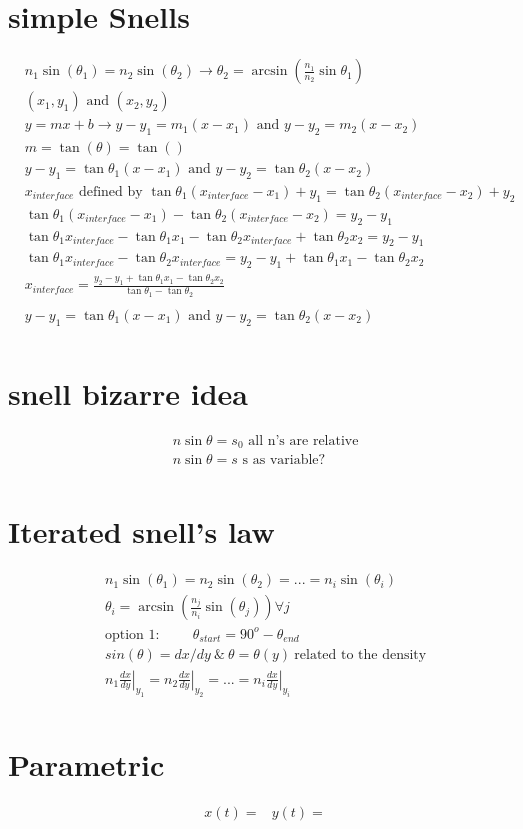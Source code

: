 \documentclass{article}
\begin{document}
	\section{simple Snells}
		\begin{align}
			&n_1\sin(\theta_1) = n_2\sin(\theta_2) \rightarrow \theta_2 = \arcsin(\frac{n_1}{n_2}\sin\theta_1)\\
			&(x_1,y_1) \text{ and } (x_2, y_2)\\
			&y=mx+b \rightarrow y-y_1 = m_1(x-x_1) \text{  and  } y-y_2 = m_2(x-x_2)\\
			& m = \tan(\theta)=\tan()\\
			&y-y_1 = \tan\theta_1(x-x_1) \text{  and  } y-y_2 = \tan\theta_2(x-x_2)\\
			&x_{interface} \text{ defined by } \tan\theta_1(x_{interface}-x_1) + y_1 = \tan\theta_2(x_{interface}-x_2) + y_2\\
			& \tan\theta_1(x_{interface}-x_1) - \tan\theta_2(x_{interface}-x_2) = y_2-y_1\\
			& \tan\theta_1x_{interface}-\tan\theta_1x_1 - \tan\theta_2x_{interface}+\tan\theta_2x_2 = y_2-y_1\\
			& \tan\theta_1x_{interface} - \tan\theta_2x_{interface} = y_2-y_1 + \tan\theta_1x_1 - \tan\theta_2x_2\\
			& x_{interface} = \frac{y_2-y_1 + \tan\theta_1x_1 - \tan\theta_2x_2}{\tan\theta_1 - \tan\theta_2}\\
			&\\
			&y-y_1 = \tan\theta_1(x-x_1) \text{  and  } y-y_2 = \tan\theta_2(x-x_2)\\
		\end{align}
	
	\section{snell bizarre idea}
	\begin{align}
		&n\sin\theta = s_0 \text{   all n's are relative}\\
		&n\sin\theta = s \text{   s as variable?}\\
			\end{align}
	
	\section{Iterated snell's law}
	\begin{align}
		&n_1\sin(\theta_1) = n_2\sin(\theta_2) =  ... = n_i\sin(\theta_i)\\
		&\theta_i = \arcsin(\frac{n_j}{n_i}\sin(\theta_j)) \forall j\\
		&\text{option 1:}\hspace{1cm} \theta_{start} = 90^o - \theta_{end}\\
		& sin(\theta) = dx/dy \ \& \ \theta = \theta(y) \ \text{related to the density}\\
		&\left. n_1\frac{d x}{d y}\right|_{y_1} = \left. n_2\frac{d x}{d y}\right|_{y_2} =  ... = \left. n_i\frac{d x}{d y}\right|_{y_i}\\
	\end{align}
	

	
	
	\section{Parametric}
	\begin{align}
		&x(t) = 
		&y(t) = 
	\end{align}
	
	
\end{document}
